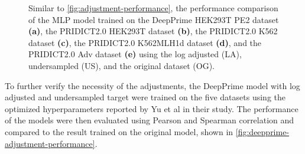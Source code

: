 \begin{figure}
    \centering
    \vspace{-3mm} %
    \vspace{-3mm} %
    \vspace{-3mm} 
    \vspace{-3mm} 
    \vspace{-3mm} 
    \caption[DeepPrime model performance comparison after adjustments]{
        Similar to \autoref{fig:adjustment-performance}, the performance comparison of the MLP model trained on the DeepPrime HEK293T PE2 dataset \textbf{(a)}, the PRIDICT2.0 HEK293T dataset \textbf{(b)}, the PRIDICT2.0 K562 dataset \textbf{(c)}, the PRIDICT2.0 K562MLH1d dataset \textbf{(d)}, and the PRIDICT2.0 Adv dataset \textbf{(e)} using the log adjusted (LA), undersampled (US), and the original dataset (OG). 
    }
    \label{fig:deepprime-adjustment-performance}
\end{figure}

To further verify the necessity of the adjustments, the DeepPrime model with log adjusted and undersampled target were trained on the five datasets using the optimized hyperparameters reported by Yu et al in their study\cite{yuPredictionEfficienciesDiverse2023}. The performance of the models were then evaluated using Pearson and Spearman correlation and compared to the result trained on the original model, shown in \autoref{fig:deepprime-adjustment-performance}.

